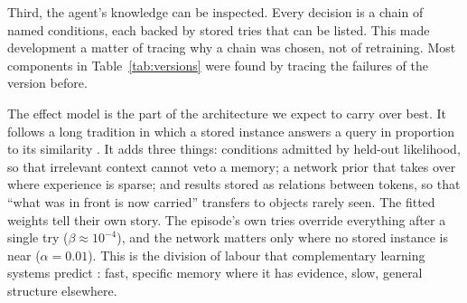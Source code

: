 \documentclass{article}
\begin{document}
Third, the agent's knowledge can be inspected. Every decision is a chain of named conditions, each backed by stored tries that can be listed. This made development a matter of tracing why a chain was chosen, not of retraining. Most components in Table~\ref{tab:versions} were found by tracing the failures of the version before.

The effect model is the part of the architecture we expect to carry over best. It follows a long tradition in which a stored instance answers a query in proportion to its similarity \cite{Medin1978,Nosofsky1986,Hintzman1986,Aha1991}. It adds three things: conditions admitted by held-out likelihood, so that irrelevant context cannot veto a memory; a network prior that takes over where experience is sparse; and results stored as relations between tokens, so that ``what was in front is now carried'' transfers to objects rarely seen. The fitted weights tell their own story. The episode's own tries override everything after a single try ($\beta\approx10^{-4}$), and the network matters only where no stored instance is near ($\alpha=0.01$). This is the division of labour that complementary learning systems predict \cite{McClelland1995,Kumaran2016}: fast, specific memory where it has evidence, slow, general structure elsewhere.
\end{document}
